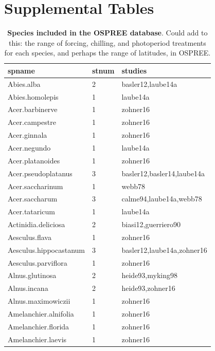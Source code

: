 \documentclass{article}
\begin{document}
\section* {Supplemental Tables}
\begin{footnotesize} 
\begin{table}[ht]
\centering
\caption{\textbf{Species included in the OSPREE database}. Could add to this: the range of forcing, chilling, and photoperiod treatments for each species, and perhaps the range of latitudes, in OSPREE.
} 
\label{tab:sp}
\begingroup\footnotesize
\begin{tabular}{|p{}|p{}|p{}|}
  \hline
spname & stnum & studies \\ 
  \hline
Abies.alba &   2 & basler12,laube14a \\ 
  Abies.homolepis &   1 & laube14a \\ 
  Acer.barbinerve &   1 & zohner16 \\ 
  Acer.campestre &   1 & zohner16 \\ 
  Acer.ginnala &   1 & zohner16 \\ 
  Acer.negundo &   1 & laube14a \\ 
  Acer.platanoides &   1 & zohner16 \\ 
  Acer.pseudoplatanus &   3 & basler12,basler14,laube14a \\ 
  Acer.saccharinum &   1 & webb78 \\ 
  Acer.saccharum &   3 & calme94,laube14a,webb78 \\ 
  Acer.tataricum &   1 & laube14a \\ 
  Actinidia.deliciosa &   2 & biasi12,guerriero90 \\ 
  Aesculus.flava &   1 & zohner16 \\ 
  Aesculus.hippocastanum &   3 & basler12,laube14a,zohner16 \\ 
  Aesculus.parviflora &   1 & zohner16 \\ 
  Alnus.glutinosa &   2 & heide93,myking98 \\ 
  Alnus.incana &   2 & heide93,zohner16 \\ 
  Alnus.maximowiczii &   1 & zohner16 \\ 
  Amelanchier.alnifolia &   1 & zohner16 \\ 
  Amelanchier.florida &   1 & zohner16 \\ 
  Amelanchier.laevis &   1 & zohner16 \\ 

\end{tabular}
\end{table}
\end{footnotesize}
\end{document}
